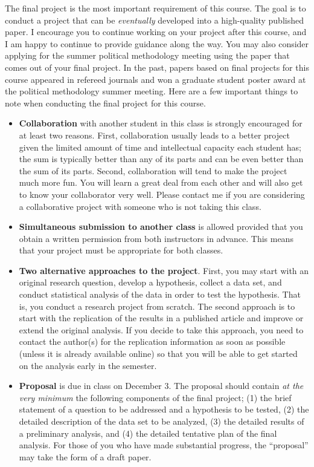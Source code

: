 \documentclass[11pt]{article}
\begin{document}
The final project is the most important requirement of this course.
The goal is to conduct a project that can be {\it eventually}
developed into a high-quality published paper.  I encourage you to
continue working on your project after this course, and I am happy to continue to provide
guidance along the way.  You may also consider applying for the summer
political methodology meeting using the paper that comes out of your
final project.  In the past, papers based on final projects for this
course appeared in refereed journals and won a graduate student poster
award at the political methodology summer meeting.  Here are a few
important things to note when conducting the final project for this
course.
\begin{itemize}
\item {\bf Collaboration} with another student in this class is
  strongly encouraged for at least two reasons.  First, collaboration
  usually leads to a better project given the limited amount of time
  and intellectual capacity each student has; the sum is typically
  better than any of its parts and can be even better than the sum of
  its parts.  Second, collaboration will tend to make the project much
  more fun.  You will learn a great deal from each other and will also
  get to know your collaborator very well.  Please contact me if you
  are considering a collaborative project with someone who is not
  taking this class.

\item {\bf Simultaneous submission to another class} is allowed
  provided that you obtain a written permission from both instructors
  in advance.  This means that your project must be appropriate for both
  classes.

\item {\bf Two alternative approaches to the project}.  First, you
  may start with an original research question, develop a hypothesis,
  collect a data set, and conduct statistical analysis of the data
  in order to test the hypothesis.  That is, you conduct a research
  project from scratch.  The second approach is to start with the
  replication of the results in a published article and improve or
  extend the original analysis.  If you decide to take this approach,
  you need to contact the author(s) for the replication information as
  soon as possible (unless it is already available online) so that you
  will be able to get started on the analysis early in the semester.

\item {\bf Proposal} is due in class on December 3.  The proposal
  should contain {\it at the very minimum} the following components of
  the final project; (1) the brief statement of a question to be
  addressed and a hypothesis to be tested, (2) the detailed
  description of the data set to be analyzed, (3) the detailed results
  of a preliminary analysis, and (4) the detailed tentative plan of
  the final analysis.  For those of you who have made substantial
  progress, the ``proposal'' may take the form of a draft paper.


\end{itemize}
\end{document}
